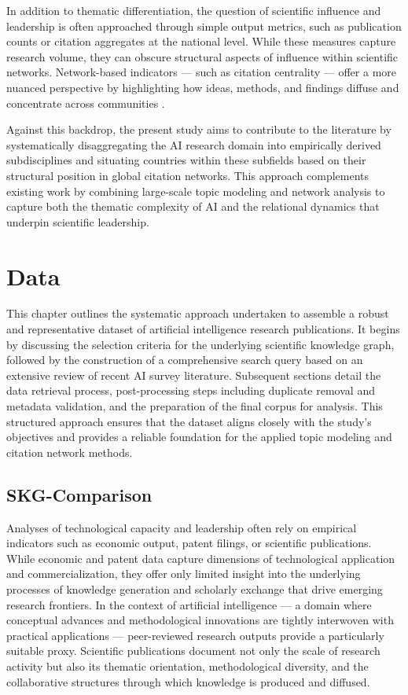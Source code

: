 \documentclass{article}
\begin{document}
In addition to thematic differentiation, the question of scientific influence and leadership is often approached through simple output metrics, such as publication counts or citation aggregates at the national level. While these measures capture research volume, they can obscure structural aspects of influence within scientific networks. Network-based indicators — such as citation centrality — offer a more nuanced perspective by highlighting how ideas, methods, and findings diffuse and concentrate across communities \cite{REF}.

Against this backdrop, the present study aims to contribute to the literature by systematically disaggregating the AI research domain into empirically derived subdisciplines and situating countries within these subfields based on their structural position in global citation networks. This approach complements existing work by combining large-scale topic modeling and network analysis to capture both the thematic complexity of AI and the relational dynamics that underpin scientific leadership.


\section{Data}


This chapter outlines the systematic approach undertaken to assemble a robust and representative dataset of artificial intelligence research publications. It begins by discussing the selection criteria for the underlying scientific knowledge graph, followed by the construction of a comprehensive search query based on an extensive review of recent AI survey literature. Subsequent sections detail the data retrieval process, post-processing steps including duplicate removal and metadata validation, and the preparation of the final corpus for analysis. This structured approach ensures that the dataset aligns closely with the study’s objectives and provides a reliable foundation for the applied topic modeling and citation network methods.

\subsection{SKG-Comparison}

Analyses of technological capacity and leadership often rely on empirical indicators such as economic output, patent filings, or scientific publications. While economic and patent data capture dimensions of technological application and commercialization, they offer only limited insight into the underlying processes of knowledge generation and scholarly exchange that drive emerging research frontiers. In the context of artificial intelligence — a domain where conceptual advances and methodological innovations are tightly interwoven with practical applications — peer-reviewed research outputs provide a particularly suitable proxy. Scientific publications document not only the scale of research activity but also its thematic orientation, methodological diversity, and the collaborative structures through which knowledge is produced and diffused.
\end{document}

